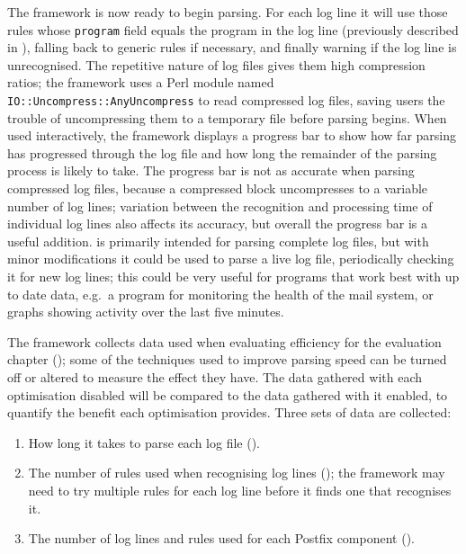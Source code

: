 The framework is now ready to begin parsing.  For each log line it will use
those rules whose \texttt{program} field equals the program in the log line
(previously described in ),
falling back to generic rules if necessary, and finally warning if the log
line is unrecognised.  The repetitive nature of log files gives them high
compression ratios; the framework uses a Perl module named
\texttt{IO::Uncompress::AnyUncompress} to read compressed log files, saving
users the trouble of uncompressing them to a temporary file before parsing
begins.  When used interactively, the framework displays a progress bar to
show how far parsing has progressed through the log file and how long the
remainder of the parsing process is likely to take.  The progress bar is
not as accurate when parsing compressed log files, because a compressed
block uncompresses to a variable number of log lines; variation between the
recognition and processing time of individual log lines also affects its
accuracy, but overall the progress bar is a useful addition.  \parsername{}
is primarily intended for parsing complete log files, but with minor
modifications it could be used to parse a live log file, periodically
checking it for new log lines; this could be very useful for programs that
work best with up to date data, e.g.\ a program for monitoring the health
of the mail system, or graphs showing activity over the last five minutes.

The framework collects data used when evaluating \parsernames{} efficiency
for the evaluation chapter (); some of the
techniques used to improve parsing speed can be turned off or altered to
measure the effect they have.  The data gathered with each optimisation
disabled will be compared to the data gathered with it enabled, to quantify
the benefit each optimisation provides.  Three sets of data are collected:

\begin{enumerate}

    \item How long it takes to parse each log file ().

    \item The number of rules used when recognising log lines
        (); the framework
        may need to try multiple rules for each log line before it finds
        one that recognises it.

    \item The number of log lines and rules used for each Postfix component
        ().

\end{enumerate}

